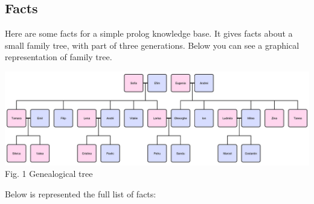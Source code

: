 \documentclass[12pt]{article}
\begin{document}
    \subsection{Facts}

    Here are some facts for a simple prolog knowledge base. It gives facts about a small family tree, with part of three generations.
    Below you can see a graphical representation of family tree.

    \newpage

    \begin{minipage}[b]{1.0\linewidth}
      \begin{center}
        \includegraphics[width=1.0\textwidth]{plia3}
         \\ Fig. 1 Genealogical tree
      \end{center}
    \end{minipage}

    \vspace{0.5cm}

   Below is represented the full list of facts:
\end{document}
